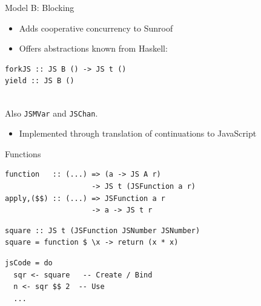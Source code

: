 \documentclass{beamer}
\begin{document}
\begin{frame}[fragile]{Model B: Blocking}

\begin{itemize}
\item Adds cooperative concurrency to Sunroof
\item Offers abstractions known from Haskell: 
\end{itemize}

\begin{codeblock}[0.6]
\begin{verbatim}
forkJS :: JS B () -> JS t ()
yield :: JS B ()
\end{verbatim}
\end{codeblock}

~\\
Also \verb|JSMVar| and \verb|JSChan|.

\begin{itemize}
\item Implemented through translation of continuations to JavaScript
\end{itemize}

\end{frame}

\begin{frame}[fragile]{Functions}

\begin{codeblock}[0.8]
\begin{verbatim}
function   :: (...) => (a -> JS A r) 
                    -> JS t (JSFunction a r)
apply,($$) :: (...) => JSFunction a r 
                    -> a -> JS t r
\end{verbatim}
\end{codeblock}


\begin{codeblock}[0.8]
\begin{verbatim}
square :: JS t (JSFunction JSNumber JSNumber)
square = function $ \x -> return (x * x)
\end{verbatim}
\end{codeblock}

\begin{codeblock}[0.8]
\begin{verbatim}
jsCode = do
  sqr <- square   -- Create / Bind
  n <- sqr $$ 2  -- Use
  ...
\end{verbatim}
\end{codeblock}
\end{frame}
\end{document}
